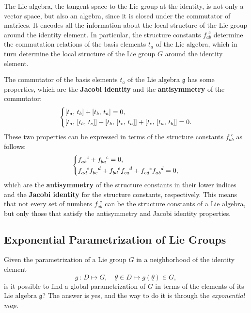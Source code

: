 The Lie algebra, the tangent space to the Lie group at the identity, is not only a vector space, but also an algebra, since it is closed under the commutator of matrices. It encodes all the information about the local structure of the Lie group around the identity element. In particular, the structure constants \(f_{ab}^{\ \ c}\) determine the commutation relations of the basis elements \(t_a\) of the Lie algebra, which in turn determine the local structure of the Lie group \(G\) around the identity element.

The commutator of the basis elements \(t_a\) of the Lie algebra \(\mathfrak{g}\) has some properties, which are the \textbf{Jacobi identity} and the \textbf{antisymmetry} of the commutator:
\[
    \begin{dcases}
        \left[ t_a,\,t_b \right] + \left[ t_b,\,t_a \right] = 0, \\
        \left[ t_a,\,\left[ t_b,\,t_c \right] \right] + \left[ t_b,\,\left[ t_c,\,t_a \right] \right] + \left[ t_c,\,\left[ t_a,\,t_b \right] \right] = 0.
    \end{dcases}
\]
These two properties can be expressed in terms of the structure constants \(f_{ab}^{\ \ c}\) as follows:
\[
    \begin{dcases}
        f_{ab}^{\ \ c} + f_{ba}^{\ \ c}                  = 0, \\
        f_{ad}^{\ \ e} f_{bc}^{\ \ d} + f_{bd}^{\ \ e} f_{ca}^{\ \ d} + f_{cd}^{\ \ e} f_{ab}^{\ \ d} = 0,
    \end{dcases}
\]
which are the \textbf{antisymmetry} of the structure constants in their lower indices and the \textbf{Jacobi identity} for the structure constants, respectively. This means that not every set of numbers \(f_{ab}^{\ \ c}\) can be the structure constants of a Lie algebra, but only those that satisfy the antisymmetry and Jacobi identity properties.

\subsection{Exponential Parametrization of Lie Groups}

Given the parametrization of a Lie group \(G\) in a neighborhood of the identity element
\[
    g \, : \, D \mapsto G, \quad \underline{\theta} \in D \mapsto g(\underline{\theta}) \in G,
\]
is it possible to find a global parametrization of \(G\) in terms of the elements of its Lie algebra \(\mathfrak{g}\)? The answer is yes, and the way to do it is through the \textit{exponential map}.

